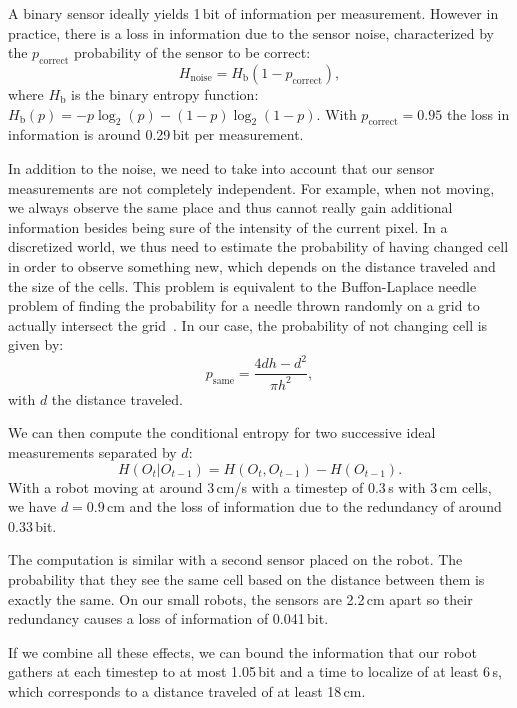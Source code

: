 \documentclass[letterpaper, 10pt, conference]{ieeeconf}
\begin{document}
A binary sensor ideally yields 1\,bit of information per measurement.
However in practice, there is a loss in information due to the sensor noise, characterized by the $p_\mathrm{correct}$ probability of the sensor to be correct:
\begin{displaymath}
	H_\mathrm{noise} = H_{\text{b}}(1 - p_\mathrm{correct}),
\end{displaymath}
where $H_{\text{b}}$ is the binary entropy function: $H_{\text{b}}(p) = -p\log_2(p) - (1-p)\log_2(1-p)$.
With $p_\mathrm{correct}=0.95$ the loss in information is around 0.29\,bit per measurement.

In addition to the noise, we need to take into account that our sensor measurements are not completely independent.
For example, when not moving, we always observe the same place and thus cannot really gain additional information besides being sure of the intensity of the current pixel.
In a discretized world, we thus need to estimate the probability of having changed cell in order to observe something new, which depends on the distance traveled and the size of the cells.
This problem is equivalent to the Buffon-Laplace needle problem of finding the probability for a needle thrown randomly on a grid to actually intersect the grid~\cite{laplace1820prob}.
In our case, the probability of not changing cell is given by:
\begin{displaymath}
	p_\mathrm{same} = \frac{4d h - d^2}{\pi h^2},
\end{displaymath}
with $d$ the distance traveled.

We can then compute the conditional entropy for two successive ideal measurements separated by $d$:
\begin{displaymath}
	H(O_t | O_{t-1}) = H(O_t, O_{t-1}) - H(O_{t-1}).
\end{displaymath}
With a robot moving at around 3\,cm/s with a timestep of 0.3\,s with 3\,cm cells, we have $d=0.9$\,cm and the loss of information due to the redundancy of around 0.33\,bit.

The computation is similar with a second sensor placed on the robot.
The probability that they see the same cell based on the distance between them is exactly the same.
On our small robots, the sensors are 2.2\,cm apart so their redundancy causes a loss of information of 0.041\,bit.

If we combine all these effects, we can bound the information that our robot gathers at each timestep to at most 1.05\,bit and a time to localize of at least 6\,s, which corresponds to a distance traveled of at least 18\,cm.
\end{document}
